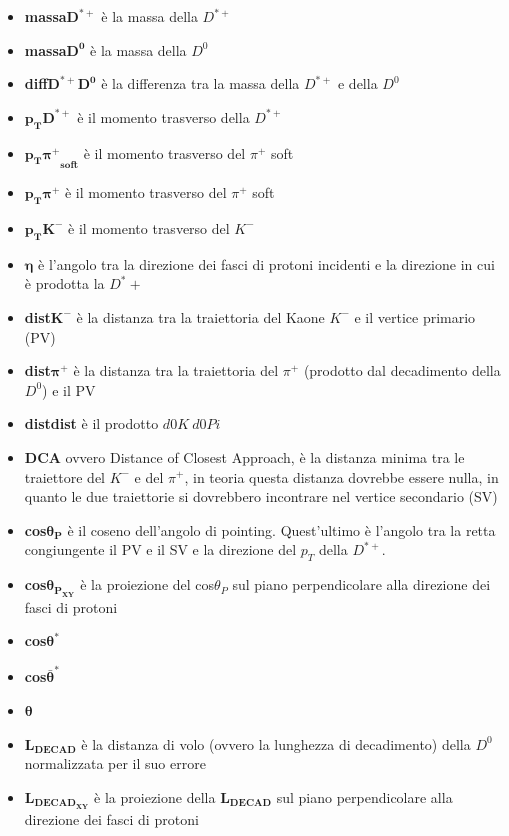         \begin{itemize}
            \item \textbf{massa$\bm{D^{*+}}$} è la massa della $D^{*+}$
            \item \textbf{massa$\bm{D^0}$} è la massa della $D^0$
            \item \textbf{diff$\bm{D^{*+}D^0}$} è la differenza tra la massa della  $D^{*+}$ e della $D^0$
            \item \textbf{$\bm{p_TD^{*+}}$} è il momento trasverso della $D^{*+}$
            \item \textbf{$\bm{{p_T\pi^+}_{soft}}$} è il momento trasverso del $\pi^+$ soft
            \item \textbf{$\bm{p_T\pi^+}$} è il momento trasverso del $\pi^+$ soft 
            \item \textbf{$\bm{p_TK^-}$} è il momento trasverso del $K^-$
            \item \textbf{$\bm{\eta}$} è l'angolo tra la direzione dei fasci di protoni incidenti e la direzione in cui è prodotta la $D^*+$ %
            \item \textbf{dist$\bm{K^-}$} è la distanza tra la traiettoria del Kaone $K^-$ e il vertice primario (PV) %
            \item \textbf{dist$\bm{\pi^+}$} è la distanza tra la traiettoria del $\pi^+$ (prodotto dal decadimento della $D^0$) e il PV
            \item \textbf{distdist} è il prodotto $d0K \ d0Pi$
            \item \textbf{DCA} ovvero Distance of Closest Approach, è la distanza minima tra le traiettore del $K^-$ e del $\pi^+$, in teoria questa distanza dovrebbe essere nulla, in quanto le due traiettorie si dovrebbero incontrare nel vertice secondario (SV) %
            \item \textbf{cos$\bm{\theta_P}$} è il coseno dell'angolo di pointing. Quest'ultimo è l'angolo tra la retta congiungente il PV e il SV e la direzione del $p_T$ della $D^{*+}$.
             \item \textbf{cos$\bm{\theta_{P_{XY}}}$} è la proiezione del cos$\theta_P$ sul piano perpendicolare alla direzione dei fasci di protoni
            \item \textbf{cos$\bm{\theta^*}$} 
            \item \textbf{cos$\bm{\bar \theta^*}$}
            \item $\bm{\theta}$ 
            \item $\bm{L_{DECAD}}$ è la distanza di volo (ovvero la lunghezza di decadimento) della $D^0$ normalizzata per il suo errore 
             \item $\bm{L_{{DECAD}_{XY}}}$ è la proiezione della $\bm{L_{DECAD}}$ sul piano perpendicolare alla direzione dei fasci di protoni
        \end{itemize}{}
       
